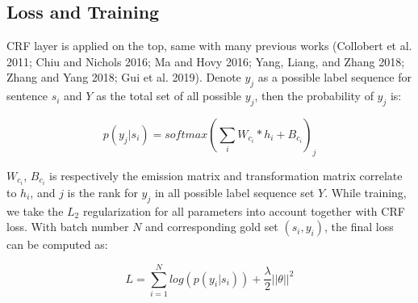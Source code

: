 \documentclass[letterpaper]{article} %
\begin{document}
\begin{table}[t]
\caption{Hyperparameters}\smallskip
\centering
{}
\label{table2}
\end{table}

\subsection{Loss and Training}

CRF layer is applied on the top, same with many previous works (Collobert et al. 2011; Chiu and Nichols 2016; Ma and Hovy 2016; Yang, Liang, and Zhang 2018; Zhang and Yang 2018; Gui et al. 2019). Denote $y_j$ as a possible label sequence for sentence $s_i$ and $Y$ as the total set of all possible $y_j$, then the probability of $y_j$ is:

\begin{equation}
p(y_j | s_i) = softmax(\sum_i{W_{c_i} * h_i} + B_{c_i})_j
\label{crf_probability}
\end{equation}

$W_{c_i}$, $B_{c_i}$ is respectively the emission matrix and transformation matrix correlate to $h_i$, and $j$ is the rank for $y_j$ in all possible label sequence set $Y$.  While training, we take the $L_2$ regularization for all parameters into account together with CRF loss. With batch number $N$ and corresponding gold set $(s_i, y_i)$, the final loss can be computed as:

\begin{equation}
L = \sum_{i=1}^{N}{log(p(y_i | s_i))} + \frac{\lambda}{2}{|| \theta ||}^2
\label{crf_probability}
\end{equation}
\end{document}
